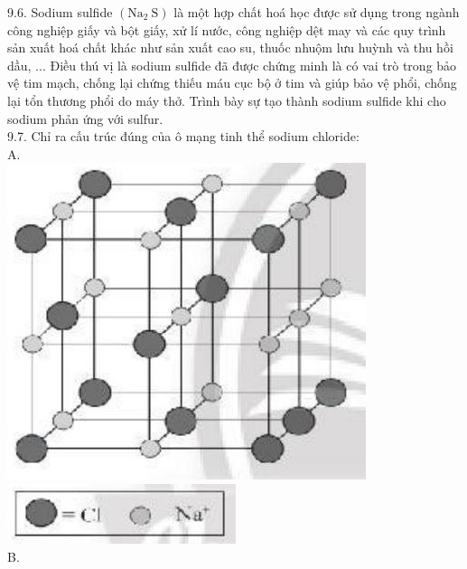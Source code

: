 \documentclass[10pt]{article}
\begin{document}
9.6. Sodium sulfide $\left(\mathrm{Na}_{2} \mathrm{~S}\right)$ là một hợp chất hoá học được sử dụng trong ngành công nghiệp giấy và bột giấy, xử lí nước, công nghiệp dệt may và các quy trình sản xuất hoá chất khác như sản xuất cao su, thuốc nhuộm lưu huỳnh và thu hồi dầu, ... Điều thú vị là sodium sulfide đã được chứng minh là có vai trò trong bảo vệ tim mạch, chống lại chứng thiếu máu cục bộ ở tim và giúp bảo vệ phổi, chống lại tổn thương phổi do máy thở. Trình bày sự tạo thành sodium sulfide khi cho sodium phản ứng với sulfur.\\
9.7. Chỉ ra cấu trúc đúng của ô mạng tinh thể sodium chloride:\\
A.\\
\includegraphics[max width=\textwidth, center]{2025_10_23_883c4b146e2332109fcdg-26(1)}\\
\includegraphics[max width=\textwidth, center]{2025_10_23_883c4b146e2332109fcdg-26}\\
B.\\
\end{document}
